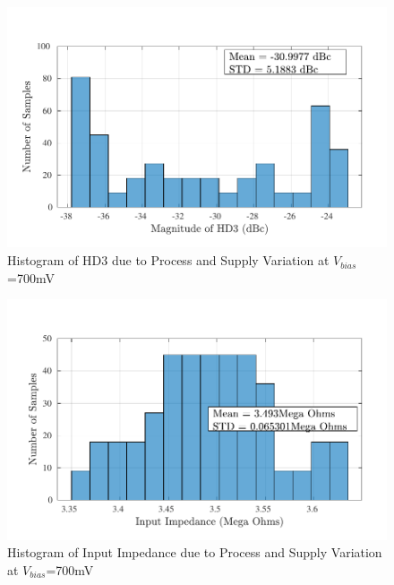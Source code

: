 \begin{figure} [H]
\centering
\includegraphics[scale=1]{Figures/Corners/Overall/PV_Max/PDFs/PV_Max_hd3.pdf}
\caption{Histogram of HD3 due to Process and Supply Variation at $V_{bias}$=700mV}
\end{figure}

\begin{figure} [H]
\centering
\includegraphics[scale=1]{Figures/Corners/Overall/PV_Max/PDFs/PV_Max_zin.pdf}
\caption{Histogram of Input Impedance due to Process and Supply Variation at $V_{bias}$=700mV}
\end{figure}

